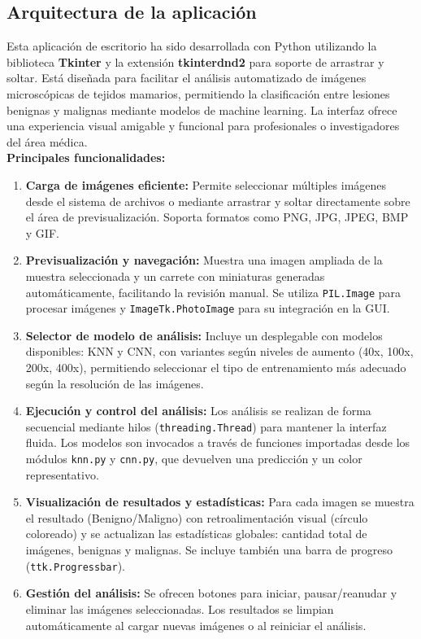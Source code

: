 \documentclass[12pt]{article} %
\begin{document}
\subsection{Arquitectura de la aplicación}
Esta aplicación de escritorio ha sido desarrollada con Python utilizando la biblioteca \textbf{Tkinter} y la extensión \textbf{tkinterdnd2} para soporte de arrastrar y soltar. Está diseñada para facilitar el análisis automatizado de imágenes microscópicas de tejidos mamarios, permitiendo la clasificación entre lesiones benignas y malignas mediante modelos de machine learning. La interfaz ofrece una experiencia visual amigable y funcional para profesionales o investigadores del área médica.\\

\textbf{Principales funcionalidades:} 

\begin{enumerate}
    \item \textbf{Carga de imágenes eficiente:}  Permite seleccionar múltiples imágenes desde el sistema de archivos o mediante arrastrar y soltar directamente sobre el área de previsualización. Soporta formatos como PNG, JPG, JPEG, BMP y GIF.

    \item \textbf{Previsualización y navegación:} Muestra una imagen ampliada de la muestra seleccionada y un carrete con miniaturas generadas automáticamente, facilitando la revisión manual. Se utiliza \textcolor[HTML]{006400}{\texttt{PIL.Image}} para procesar imágenes y \textcolor[HTML]{006400}{\texttt{ImageTk.PhotoImage}} para su integración en la GUI.
    \item \textbf{Selector de modelo de análisis:} Incluye un desplegable con modelos disponibles: KNN y CNN, con variantes según niveles de aumento (40x, 100x, 200x, 400x), permitiendo seleccionar el tipo de entrenamiento más adecuado según la resolución de las imágenes.
    \item \textbf{Ejecución y control del análisis:} 
    Los análisis se realizan de forma secuencial mediante hilos (\textcolor[HTML]{006400}{\texttt{threading.Thread}}) para mantener la interfaz fluida. Los modelos son invocados a través de funciones importadas desde los módulos \textcolor[HTML]{006400}{\texttt{knn.py}} y \textcolor[HTML]{006400}{\texttt{cnn.py}}, que devuelven una predicción y un color representativo.
    \item \textbf{Visualización de resultados y estadísticas:}
    Para cada imagen se muestra el resultado (Benigno/Maligno) con retroalimentación visual (círculo coloreado) y se actualizan las estadísticas globales: cantidad total de imágenes, benignas y malignas. Se incluye también una barra de progreso (\textcolor[HTML]{006400}{\texttt{ttk.Progressbar}}).
    \item \textbf{Gestión del análisis:} 
    Se ofrecen botones para iniciar, pausar/reanudar y eliminar las imágenes seleccionadas. Los resultados se limpian automáticamente al cargar nuevas imágenes o al reiniciar el análisis.
\end{enumerate}
\end{document}
